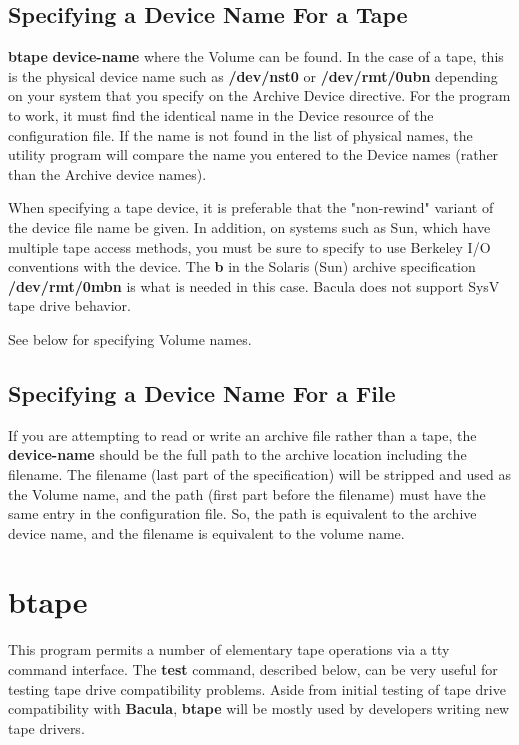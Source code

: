 \subsection{Specifying a Device Name For a Tape}

{\bf btape} {\bf device-name} where the Volume can be found. In the case of a
tape, this is the physical device name such as {\bf /dev/nst0} or {\bf
/dev/rmt/0ubn} depending on your system that you specify on the Archive Device
directive. For the program to work, it must find the identical name in the
Device resource of the configuration file. If the name is not found in the
list of physical names, the utility program will compare the name you entered
to the Device names (rather than the Archive device names).

When specifying a tape device, it is preferable that the "non-rewind"
variant of the device file name be given.  In addition, on systems such as
Sun, which have multiple tape access methods, you must be sure to specify
to use Berkeley I/O conventions with the device.  The
{\bf b} in the Solaris (Sun) archive specification {\bf /dev/rmt/0mbn} is
what is needed in this case.  Bacula does not support SysV tape drive
behavior.

See below for specifying Volume names.

\subsection{Specifying a Device Name For a File}

If you are attempting to read or write an archive file rather than a tape, the
{\bf device-name} should be the full path to the archive location including
the filename. The filename (last part of the specification) will be stripped
and used as the Volume name, and the path (first part before the filename)
must have the same entry in the configuration file. So, the path is equivalent
to the archive device name, and the filename is equivalent to the volume name.


\section{btape}
\label{btape1}

This program permits a number of elementary tape operations via a tty command
interface. The {\bf test} command, described below, can be very useful for
testing tape drive compatibility problems. Aside from initial testing of tape
drive compatibility with {\bf Bacula}, {\bf btape} will be mostly used by
developers writing new tape drivers.

